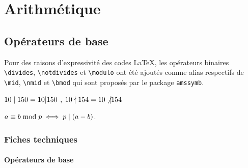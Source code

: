\documentclass[12pt,a4paper]{article}
\begin{document}
\section{Arithmétique}

\subsection{Opérateurs de base}

Pour des raisons d'expressivité des codes \LaTeX{}, les opérateurs binaires \verb+\divides+, \verb+\notdivides+ et \verb+\modulo+ ont été ajoutés comme alias respectifs de \verb+\mid+, \verb+\nmid+ et \verb+\bmod+ qui sont proposés par le package \verb+amssymb+.

\begin{latexex}
$10 \mid 150 = 10 | 150$ ,
$10 \nmid 154 = 10 \not| 154$

$a \equiv b \bmod p
 \iff
 p \mid (a - b)$.
\end{latexex}




\subsubsection{Fiches techniques}

\paragraph{Opérateurs de base}



\extraspace

\end{document}
